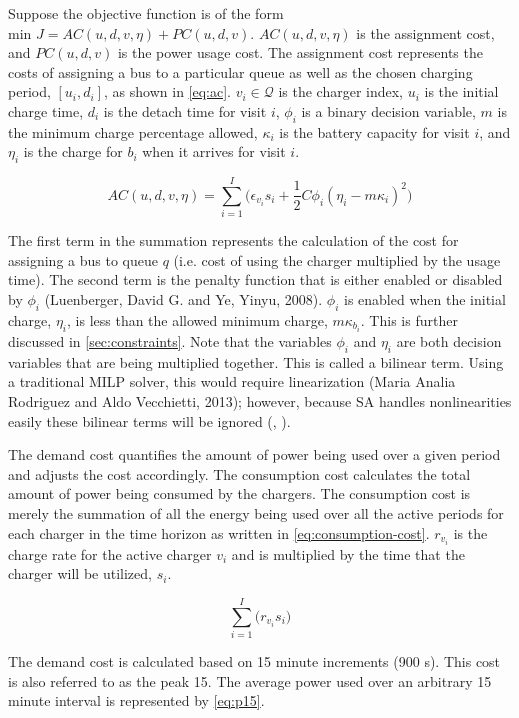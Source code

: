 \documentclass[11pt,a4paper,final]{article}
\newcommand{\AC}{AC(u, d, v, \eta)}         %
\newcommand{\PC}{PC(u, d, v)}               %
\newcommand{\Qset}{\mathcal{Q}}             %
\begin{document}
Suppose the objective function is of the form \(\text{min } J = \AC + \PC\). \(\AC\) is the assignment cost, and \(\PC\) is
the power usage cost. The assignment cost represents the costs of assigning a bus to a particular queue as well as the
chosen charging period, \([u_i, d_i]\), as shown in \ref{eq:ac}. \(v_i \in \Qset\) is the charger index, \(u_i\) is the initial
charge time, \(d_i\) is the detach time for visit \(i\), \(\phi_i\) is a binary decision variable, \(m\) is the minimum charge
percentage allowed, \(\kappa_i\) is the battery capacity for visit \(i\), and \(\eta_i\) is the charge for \(b_i\) when it
arrives for visit \(i\).

\begin{equation}
\label{eq:ac}
\AC = \sum_{i=1}^I \Big(\epsilon_{v_i}s_i + \frac{1}{2} C \phi_i (\eta_i - m \kappa_i)^{2}\Big)
\end{equation}

The first term in the summation represents the calculation of the cost for assigning a bus to queue \(q\) (i.e. cost of
using the charger multiplied by the usage time). The second term is the penalty function that is either enabled or
disabled by \(\phi_i\) (Luenberger, David G. and Ye, Yinyu, 2008). \(\phi_i\) is enabled when the initial charge, \(\eta_i\), is less
than the allowed minimum charge, \(m\kappa_{b_i}\). This is further discussed in \ref{sec:constraints}. Note that the variables
\(\phi_i\) and \(\eta_i\) are both decision variables that are being multiplied together. This is called a bilinear term. Using a
traditional MILP solver, this would require linearization (Maria Analia Rodriguez and Aldo Vecchietti, 2013); however, because SA handles
nonlinearities easily these bilinear terms will be ignored (, ).

The demand cost quantifies the amount of power being used over a given period and adjusts the cost accordingly. The
consumption cost calculates the total amount of power being consumed by the chargers. The consumption cost is merely the
summation of all the energy being used over all the active periods for each charger in the time horizon as written in
\ref{eq:consumption-cost}. \(r_{v_i}\) is the charge rate for the active charger \(v_i\) and is multiplied by the time that the
charger will be utilized, \(s_i\).

\begin{equation}
\label{eq:consumption-cost}
  \sum_{i=1}^I \Big( r_{v_i}s_i \Big)
\end{equation}

The demand cost is calculated based on 15 minute increments (900 s). This cost is also referred to as the peak 15. The
average power used over an arbitrary 15 minute interval is represented by \ref{eq:p15}.
\end{document}
